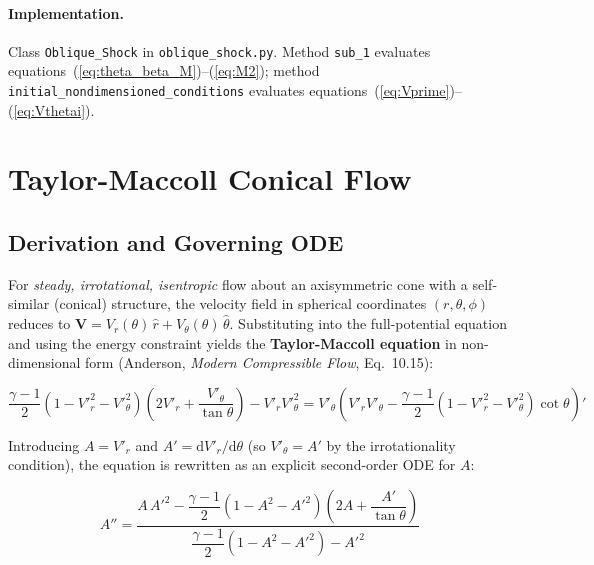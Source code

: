 \documentclass[12pt,a4paper]{article}
\begin{document}
\paragraph{Implementation.}
Class \texttt{Oblique\_Shock} in \texttt{oblique\_shock.py}.
Method \texttt{sub\_1} evaluates equations~(\ref{eq:theta_beta_M})--(\ref{eq:M2});
method \texttt{initial\_nondimensioned\_conditions} evaluates
equations~(\ref{eq:Vprime})--(\ref{eq:Vthetai}).

\section{Taylor-Maccoll Conical Flow}
\label{sec:TM}

\subsection{Derivation and Governing ODE}

For \emph{steady, irrotational, isentropic} flow about an axisymmetric cone
with a self-similar (conical) structure, the velocity field in spherical
coordinates $(r, \theta, \phi)$ reduces to $\mathbf{V} = V_r(\theta)\,\hat{r} +
V_\theta(\theta)\,\hat{\theta}$.  Substituting into the full-potential equation
and using the energy constraint yields the \textbf{Taylor-Maccoll equation} in
non-dimensional form (Anderson, \emph{Modern Compressible Flow}, Eq.~10.15):

\begin{equation}
    \frac{\gamma-1}{2}
    \left(1 - V'^2_r - V'^2_\theta\right)
    \left(2V'_r + \frac{V'_\theta}{\tan\theta}\right)
    -V'_r V'^2_\theta
    = V'_\theta
    \left(V'_r V'_\theta - \frac{\gamma-1}{2}(1-V'^2_r - V'^2_\theta)\cot\theta\right)'
    \label{eq:TM_raw}
\end{equation}

Introducing $A = V'_r$ and $A' = \mathrm{d}V'_r/\mathrm{d}\theta$ (so
$V'_\theta = A'$ by the irrotationality condition), the equation is rewritten
as an explicit second-order ODE for $A$:

\begin{equation}
\boxed{
    A'' = \frac{A\,A'^2 - \dfrac{\gamma-1}{2}(1-A^2-A'^2)\!\left(2A + \dfrac{A'}{\tan\theta}\right)}
              {\dfrac{\gamma-1}{2}(1-A^2-A'^2) - A'^2}
}
\label{eq:TM}
\end{equation}
\end{document}
